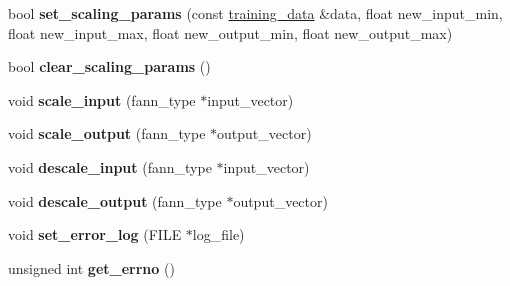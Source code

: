 \begin{DoxyCompactItemize}
\item 
\hypertarget{class_f_a_n_n_1_1neural__net_a369029383d9950704728862138bed5fd}{bool {\bfseries set\-\_\-scaling\-\_\-params} (const \hyperlink{class_f_a_n_n_1_1training__data}{training\-\_\-data} \&data, float new\-\_\-input\-\_\-min, float new\-\_\-input\-\_\-max, float new\-\_\-output\-\_\-min, float new\-\_\-output\-\_\-max)}\label{class_f_a_n_n_1_1neural__net_a369029383d9950704728862138bed5fd}

\item 
\hypertarget{class_f_a_n_n_1_1neural__net_a85c82f959815706ea5a19d942afb5848}{bool {\bfseries clear\-\_\-scaling\-\_\-params} ()}\label{class_f_a_n_n_1_1neural__net_a85c82f959815706ea5a19d942afb5848}

\item 
\hypertarget{class_f_a_n_n_1_1neural__net_af04c87cf48c180cd767cdf9ef7c92bb5}{void {\bfseries scale\-\_\-input} (fann\-\_\-type $\ast$input\-\_\-vector)}\label{class_f_a_n_n_1_1neural__net_af04c87cf48c180cd767cdf9ef7c92bb5}

\item 
\hypertarget{class_f_a_n_n_1_1neural__net_a026b995bf825e700f79fcf561f2d72f5}{void {\bfseries scale\-\_\-output} (fann\-\_\-type $\ast$output\-\_\-vector)}\label{class_f_a_n_n_1_1neural__net_a026b995bf825e700f79fcf561f2d72f5}

\item 
\hypertarget{class_f_a_n_n_1_1neural__net_a699bb92a29585ed6f37a8616b40b3707}{void {\bfseries descale\-\_\-input} (fann\-\_\-type $\ast$input\-\_\-vector)}\label{class_f_a_n_n_1_1neural__net_a699bb92a29585ed6f37a8616b40b3707}

\item 
\hypertarget{class_f_a_n_n_1_1neural__net_af5b2068df164d303a65f7958149b4821}{void {\bfseries descale\-\_\-output} (fann\-\_\-type $\ast$output\-\_\-vector)}\label{class_f_a_n_n_1_1neural__net_af5b2068df164d303a65f7958149b4821}

\item 
\hypertarget{class_f_a_n_n_1_1neural__net_aecec12b7707a082feb73abf277ae379b}{void {\bfseries set\-\_\-error\-\_\-log} (F\-I\-L\-E $\ast$log\-\_\-file)}\label{class_f_a_n_n_1_1neural__net_aecec12b7707a082feb73abf277ae379b}

\item 
\hypertarget{class_f_a_n_n_1_1neural__net_aa1e2b4f9abbd890281b08e7cc1119576}{unsigned int {\bfseries get\-\_\-errno} ()}\label{class_f_a_n_n_1_1neural__net_aa1e2b4f9abbd890281b08e7cc1119576}


\end{DoxyCompactItemize}
